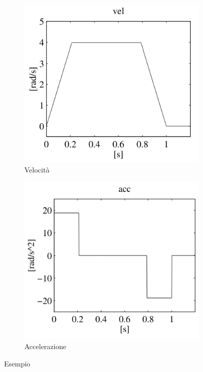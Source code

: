 \begin{example}
\begin{figure}[H]
\begin{subfigure}{0.3\linewidth}
		\includegraphics[width=\linewidth]{images/trajectories_13}
		\caption{Velocità}
		\label{fig:trajectories13}
	\end{subfigure}
	\hfill
	\begin{subfigure}{0.3\linewidth}
		\centering
		\includegraphics[width=\linewidth]{images/trajectories_14}
		\caption{Accelerazione}
		\label{fig:trajectories14}
	\end{subfigure}	
	\caption{Esempio}
\end{figure}
\end{example}




